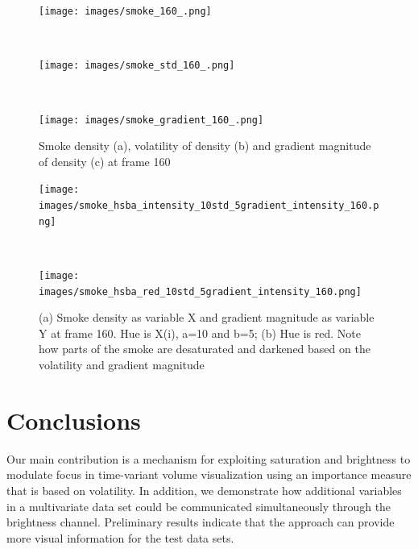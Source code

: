 \begin{figure}
\centering
\begin{minipage}{.33\textwidth}
\texttt{[image: images/smoke\_160\_.png]}
\subcaption{}
\end{minipage}~
\begin{minipage}{.33\textwidth}
\texttt{[image: images/smoke\_std\_160\_.png]}
\subcaption{}
\end{minipage}~
\begin{minipage}{.33\textwidth}
\texttt{[image: images/smoke\_gradient\_160\_.png]}
\subcaption{}
\end{minipage}
\caption{Smoke density (a), volatility of density (b) and gradient magnitude of density (c) at frame 160}
\label{fig:smoke_gray}
\end{figure}

\begin{figure}
\centering
\begin{minipage}{.33\textwidth}
\texttt{[image: images/smoke\_hsba\_intensity\_10std\_5gradient\_intensity\_160.png]}
\subcaption{}
\end{minipage}~
\begin{minipage}{.33\textwidth}
\texttt{[image: images/smoke\_hsba\_red\_10std\_5gradient\_intensity\_160.png]}
\subcaption{}
\end{minipage}
\caption[Smoke density as variable X and gradient magnitude as variable Y at frame 160]{(a) Smoke density as variable X and gradient magnitude as variable Y at frame 160. Hue is X(i), a=10 and b=5; (b) Hue is red. Note how parts of the smoke are desaturated and darkened based on the volatility and gradient magnitude}
\label{fig:smoke_hsba}
\end{figure}

\section{Conclusions}
Our main contribution is a mechanism for exploiting saturation and brightness to modulate focus in time-variant volume visualization using an importance measure that is based on volatility. In addition, we demonstrate how additional variables in a multivariate data set could be communicated simultaneously through the brightness channel. Preliminary results indicate that the approach can provide more visual information for the test data sets.

